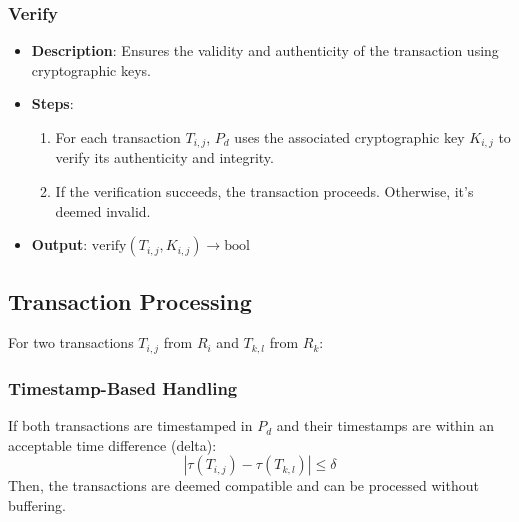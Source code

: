\documentclass{article}
\begin{document}
\subsubsection{Verify}
\begin{itemize}
    \item \textbf{Description}: Ensures the validity and authenticity of the transaction using cryptographic keys.
    \item \textbf{Steps}:
    \begin{enumerate}
        \item For each transaction \( T_{i,j} \), \( P_d \) uses the associated cryptographic key \( K_{i,j} \) to verify its authenticity and integrity.
        \item If the verification succeeds, the transaction proceeds. Otherwise, it’s deemed invalid.
    \end{enumerate}
    \item \textbf{Output}: \( \text{verify}(T_{i,j}, K_{i,j}) \rightarrow \text{bool} \)
\end{itemize}

\subsection{Transaction Processing}

For two transactions \( T_{i,j} \) from \( R_i \) and \( T_{k,l} \) from \( R_k \):

\subsubsection{Timestamp-Based Handling}
    If both transactions are timestamped in \( P_d \) and their timestamps are within an acceptable time difference (delta):
    \[ |\tau(T_{i,j}) - \tau(T_{k,l})| \leq \delta \]
    Then, the transactions are deemed compatible and can be processed without buffering.
\end{document}
